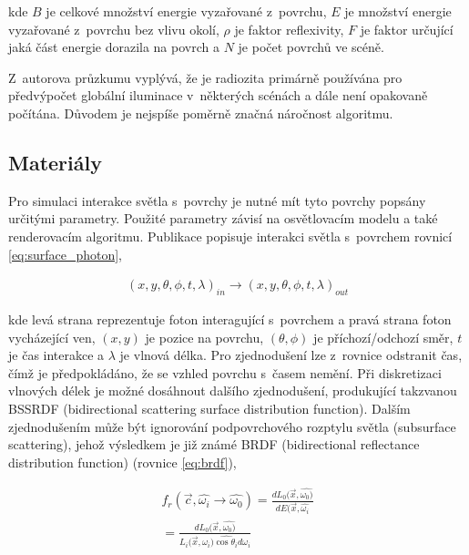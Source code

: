 kde $B$ je celkové množství energie vyzařované z~povrchu, $E$ je množství energie vyzařované z~povrchu bez vlivu okolí, $\rho$ je faktor reflexivity, $F$ je faktor určující jaká část energie dorazila na povrch a $N$ je počet povrchů ve scéně.

Z~autorova průzkumu vyplývá, že je radiozita primárně používána pro předvýpočet globální iluminace v~některých scénách a dále není opakovaně počítána. Důvodem je nejspíše poměrně značná náročnost algoritmu.

\subsection{Materiály}
Pro simulaci interakce světla s~povrchy je nutné mít tyto povrchy popsány určitými parametry. Použité parametry závisí na osvětlovacím modelu a také renderovacím algoritmu. Publikace \cite{materials} popisuje interakci světla s~povrchem rovnicí \ref{eq:surface_photon},

\begin{equation} \label{eq:surface_photon}
	\begin{gathered}
		(x, y, \theta, \phi, t, \lambda)_{in} \xrightarrow{} (x, y, \theta, \phi, t, \lambda)_{out}
	\end{gathered}
\end{equation}

kde levá strana reprezentuje foton interagující s~povrchem a pravá strana foton vycházející ven, $(x, y)$ je pozice na povrchu, $(\theta, \phi)$ je příchozí/odchozí směr, $t$ je čas interakce a $\lambda$ je vlnová délka. Pro zjednodušení lze z~rovnice odstranit čas, čímž je předpokládáno, že se vzhled povrchu s~časem nemění. Při diskretizaci vlnových délek je možné dosáhnout dalšího zjednodušení, produkující takzvanou BSSRDF (bidirectional scattering surface distribution function). Dalším zjednodušením může být ignorování podpovrchového rozptylu světla (subsurface scattering), jehož výsledkem je již známé BRDF (bidirectional reflectance distribution function) (rovnice \ref{eq:brdf}),

\begin{equation} \label{eq:brdf}
	\begin{gathered}
		f_r(\vec{c}, \hat{\omega_i} \xrightarrow{} \hat{\omega_0}) = \frac{dL_0(\vec{x}, \hat{\omega_0)}}{dE(\vec{x}, \hat{\omega_i}} \\
		= \frac{dL_0(\vec{x}, \hat{\omega_0)}}{L_i(\vec{x}, \hat{\omega_i)\cos \theta_i d\omega_i}}
	\end{gathered}
\end{equation}


